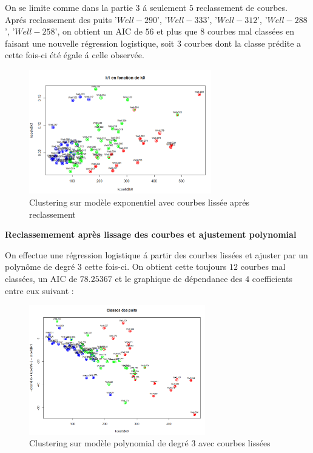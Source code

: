 \documentclass[12pt]{article}
\begin{document}
On se limite comme dans la partie $3$ \'a seulement $5$ reclassement de courbes.
Apr\'es reclassement des puits  '$Well-290$', '$Well-333$', '$Well-312$', '$Well-288$', '$Well-258$', on obtient un AIC de $56$ et plus que $8$ courbes mal class\'ees en faisant une nouvelle r\'egression logistique, soit $3$ courbes dont la classe pr\'edite a cette fois-ci \'et\'e \'egale \'a celle observ\'ee.

\begin{figure}[H]
 \centering %
	\includegraphics[width=300px]{smooth_clustering_exp_2}
  \caption{\label{fig:reg_exp_clust_2} Clustering sur mod\`ele exponentiel avec courbes liss\'ee apr\'es reclassement}
\end{figure}

\newpage

\textbf{Reclassemement apr\`es lissage des courbes et ajustement polynomial}

On effectue une r\'egression logistique \'a partir des courbes liss\'ees et ajuster par un polyn\^ome de degr\'e $3$ cette fois-ci.
On obtient cette toujours $12$ courbes mal class\'ees, un AIC de $78.25367$ et le graphique de dépendance des $4$ coefficients entre eux suivant : 

\begin{figure}[H]
 \centering %
	\includegraphics[width=290px]{cluster_poly_1}
  \caption{\label{fig:reg_exp_clust} Clustering sur mod\`ele polynomial de degr\'e $3$ avec courbes liss\'ees}
\end{figure}
\end{document}
